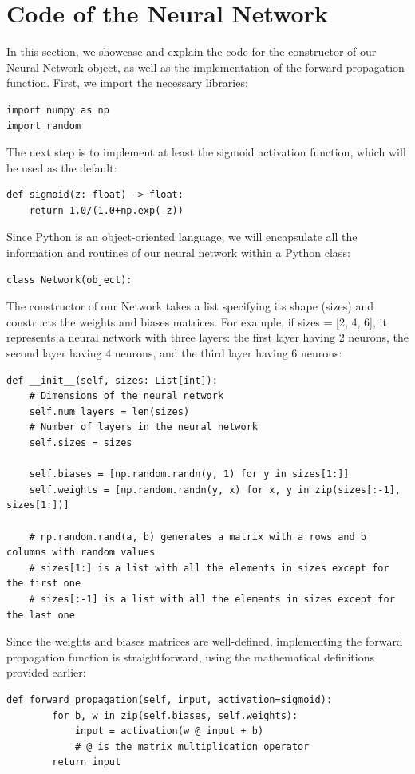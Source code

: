 \documentclass[../main]{subfiles}
\begin{document}
\section{Code of the Neural Network}
In this section, we showcase and explain the code for the constructor of our Neural Network object, as well as the implementation of the forward propagation function. First, we import the necessary libraries:
\begin{lstlisting}
import numpy as np
import random
\end{lstlisting}
The next step is to implement at least the sigmoid activation function, which will be used as the default:
\begin{lstlisting}
def sigmoid(z: float) -> float:
    return 1.0/(1.0+np.exp(-z))
\end{lstlisting}
Since Python is an object-oriented language, we will encapsulate all the information and routines of our neural network within a Python class:
\begin{lstlisting}
class Network(object):
\end{lstlisting}

The constructor of our Network takes a list specifying its shape (sizes) and constructs the weights and biases matrices. For example, if sizes = [2, 4, 6], it represents a neural network with three layers: the first layer having 2 neurons, the second layer having 4 neurons, and the third layer having 6 neurons:
\begin{lstlisting}
def __init__(self, sizes: List[int]):
    # Dimensions of the neural network
    self.num_layers = len(sizes)
    # Number of layers in the neural network
    self.sizes = sizes

    self.biases = [np.random.randn(y, 1) for y in sizes[1:]]
    self.weights = [np.random.randn(y, x) for x, y in zip(sizes[:-1], sizes[1:])]
    
    # np.random.rand(a, b) generates a matrix with a rows and b columns with random values
    # sizes[1:] is a list with all the elements in sizes except for the first one
    # sizes[:-1] is a list with all the elements in sizes except for the last one
\end{lstlisting}
Since the weights and biases matrices are well-defined, implementing the forward propagation function is straightforward, using the mathematical definitions provided earlier:
\begin{lstlisting}
def forward_propagation(self, input, activation=sigmoid):
        for b, w in zip(self.biases, self.weights):
            input = activation(w @ input + b)
            # @ is the matrix multiplication operator
        return input
\end{lstlisting}
\end{document}

